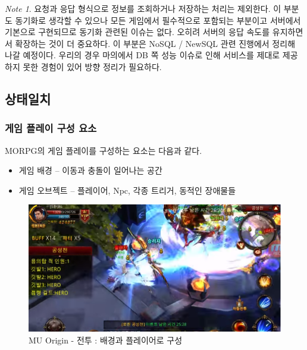\documentclass[ %
    a4paper,    %
    amsmath,    %
    itemph,     %
]{oblivoir}     %
\theoremstyle{definition}
\theoremstyle{remark}
\newtheorem{note}{Note}[section]
\theoremstyle{plain}
\begin{document}
\begin{tcolorbox}[colback=green!5,colframe=brown1!40!black,title=제외 항목]
\begin{note}
  요청과 응답 형식으로 정보를 조회하거나 저장하는 처리는 제외한다. 이 부분도 동기화로 생각할 수 있으나
  모든 게임에서 필수적으로 포함되는 부분이고 서버에서 기본으로 구현되므로 동기화 관련된 이슈는 없다.
  오히려 서버의 응답 속도를 유지하면서 확장하는 것이 더 중요하다. 이 부분은 NoSQL / NewSQL 관련 진행에서
  정리해 나갈 예정이다. 우리의 경우 마의에서 DB 쪽 성능 이슈로 인해 서비스를 제대로 제공하지 못한 경험이 있어
  방향 정리가 필요하다.
\end{note}
\end{tcolorbox}

\subsection{상태일치}

\subsubsection{게임 플레이 구성 요소}

MORPG의 게임 플레이를 구성하는 요소는 다음과 같다.
\begin{tcolorbox}[colback=green!5,colframe=green!40!black,title=게임 플레이 구성 요소]
\begin{itemize}
  \item{게임 배경} -- 이동과 충돌이 일어나는 공간
  \item{게임 오브젝트} -- 플레이어, Npc, 각종 트리거, 동적인 장애물들
\end{itemize}
\end{tcolorbox}

\begin{figure}[h!]
\includegraphics[scale=0.6]{mu_origin_battle.png}
\caption{MU Origin - 전투 : 배경과 플레이어로 구성}
\label{fig:mu_origin_battle}
\end{figure}
\end{document}
